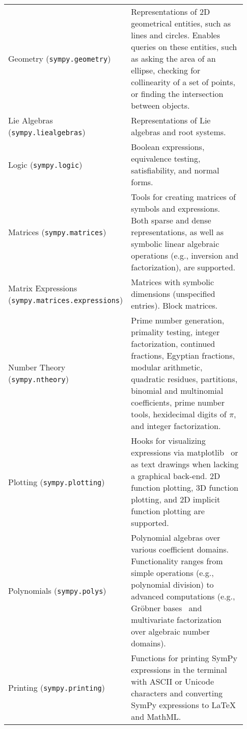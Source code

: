 \begin{longtable}[htbc]{>{\raggedright}p{0.30\linewidth}p{0.63\linewidth}}
Geometry (\texttt{sympy.geometry}) & Representations of 2D geometrical entities, such as lines and
circles. Enables queries on these entities, such as asking the area of an
ellipse, checking for collinearity of a set of
points, or finding the intersection between objects.\\

Lie Algebras (\texttt{sympy.liealgebras}) & Representations of Lie algebras and root systems.\\

Logic (\texttt{sympy.logic}) & Boolean expressions, equivalence testing, satisfiability, and normal
forms.\\

Matrices (\texttt{sympy.matrices}) & Tools for creating matrices of symbols and expressions.
Both sparse and dense representations, as well as symbolic linear
algebraic operations (e.g., inversion and factorization), are
supported.\\

Matrix Expressions (\texttt{sympy.matrices.expressions}) & Matrices with symbolic dimensions (unspecified entries).
Block matrices.\\

Number Theory (\texttt{sympy.ntheory}) & Prime number generation, primality testing, integer
factorization, continued fractions, Egyptian fractions, modular arithmetic,
quadratic residues, partitions, binomial and multinomial coefficients,
prime number tools, hexidecimal digits of $\pi$, and integer factorization. \\

Plotting (\texttt{sympy.plotting}) & Hooks for visualizing expressions via matplotlib~\cite{Hunter:2007}
or as text drawings when lacking a graphical back-end. 2D function plotting,
3D function
plotting, and 2D implicit function plotting are supported.\\

Polynomials (\texttt{sympy.polys}) & Polynomial algebras over various coefficient domains.
Functionality ranges from simple operations (e.g., polynomial division) to
advanced computations (e.g., Gr\"obner bases~\cite{adams1994introduction} and multivariate
factorization over algebraic number domains).\\

Printing (\texttt{sympy.printing}) & Functions for printing SymPy expressions in the terminal with ASCII
or Unicode characters and converting SymPy expressions to \LaTeX{} and
MathML.\\


\end{longtable}
